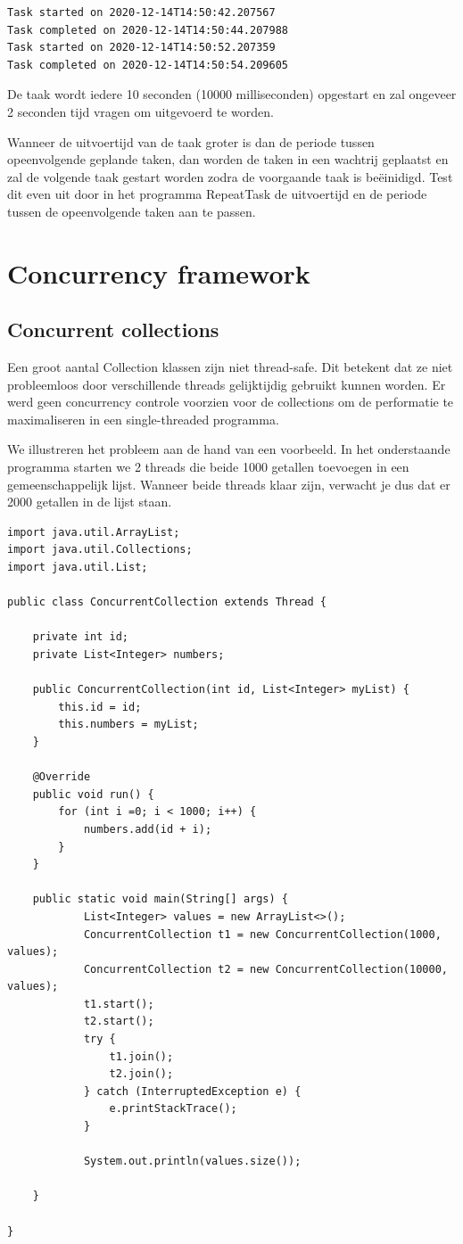 \documentclass{tstextbook}
\begin{document}
\begin{verbatim}
Task started on 2020-12-14T14:50:42.207567
Task completed on 2020-12-14T14:50:44.207988
Task started on 2020-12-14T14:50:52.207359
Task completed on 2020-12-14T14:50:54.209605
\end{verbatim}

De taak wordt iedere 10 seconden (10000 milliseconden) opgestart en zal ongeveer 2 seconden tijd vragen om uitgevoerd te worden.

Wanneer de uitvoertijd van de taak groter is dan de periode tussen opeenvolgende geplande taken, dan worden de taken in een wachtrij geplaatst en zal de volgende taak gestart worden zodra de voorgaande taak is be\"einidigd. Test dit even uit door in het programma RepeatTask de uitvoertijd en de periode tussen de opeenvolgende taken aan te passen.


\section{Concurrency framework}

\subsection{Concurrent collections}

Een groot aantal Collection klassen zijn niet thread-safe. Dit betekent dat ze niet probleemloos door verschillende threads gelijktijdig gebruikt kunnen worden.
Er werd geen concurrency controle voorzien voor de collections om de performatie te maximaliseren in een single-threaded programma.

We illustreren het probleem aan de hand van een voorbeeld. In het onderstaande programma starten we 2 threads die beide 1000 getallen toevoegen in een gemeenschappelijk lijst. Wanneer beide threads klaar zijn, verwacht je dus dat er 2000 getallen in de lijst staan. 

\begin{lstlisting}
import java.util.ArrayList;
import java.util.Collections;
import java.util.List;

public class ConcurrentCollection extends Thread {

	private int id;
	private List<Integer> numbers;

	public ConcurrentCollection(int id, List<Integer> myList) {
		this.id = id;
		this.numbers = myList;
	}

	@Override
	public void run() {
		for (int i =0; i < 1000; i++) {
			numbers.add(id + i);
		}
	}

	public static void main(String[] args) {
			List<Integer> values = new ArrayList<>();
			ConcurrentCollection t1 = new ConcurrentCollection(1000, values);
			ConcurrentCollection t2 = new ConcurrentCollection(10000, values);
			t1.start();
			t2.start();
			try {
				t1.join();
				t2.join();
			} catch (InterruptedException e) {
				e.printStackTrace();
			}

			System.out.println(values.size());

	}

}
\end{lstlisting}
\end{document}
